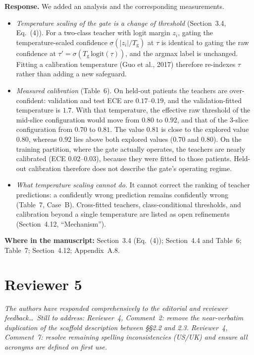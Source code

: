 \documentclass[11pt]{article}
\newenvironment{rcomment}{\par\noindent\begin{minipage}{\linewidth}\itshape\color{black!75}}{\end{minipage}\par}
\newcommand{\where}[1]{\par\noindent\textbf{Where in the manuscript:} #1\par}
\begin{document}
\textbf{Response.} We added an analysis and the corresponding measurements.
\begin{itemize}[leftmargin=1.4em]
  \item \emph{Temperature scaling of the gate is a change of threshold} (Section~3.4, Eq.~(4)). For a two-class teacher with logit margin $z_i$, gating the temperature-scaled confidence $\sigma(|z_i|/T_{\mathrm{g}})$ at $\tau$ is identical to gating the raw confidence at $\tau'=\sigma(T_{\mathrm{g}}\,\mathrm{logit}(\tau))$, and the argmax label is unchanged. Fitting a calibration temperature (Guo et al., 2017) therefore re-indexes $\tau$ rather than adding a new safeguard.
  \item \emph{Measured calibration} (Table~6). On held-out patients the teachers are over-confident: validation and test ECE are $0.17$--$0.19$, and the validation-fitted temperature is $1.7$. With that temperature, the effective raw threshold of the mid-slice configuration would move from $0.80$ to $0.92$, and that of the 3-slice configuration from $0.70$ to $0.81$. The value $0.81$ is close to the explored value $0.80$, whereas $0.92$ lies above both explored values ($0.70$ and $0.80$). On the training partition, where the gate actually operates, the teachers are nearly calibrated (ECE $0.02$--$0.03$), because they were fitted to those patients. Held-out calibration therefore does not describe the gate's operating regime.
  \item \emph{What temperature scaling cannot do.} It cannot correct the ranking of teacher predictions: a confidently wrong prediction remains confidently wrong (Table~7, Case~B). Cross-fitted teachers, class-conditional thresholds, and calibration beyond a single temperature are listed as open refinements (Section~4.12, ``Mechanism'').
\end{itemize}
\where{Section~3.4 (Eq.~(4)); Section~4.4 and Table~6; Table~7; Section~4.12; Appendix~A.8.}

\hrulefill

\section*{Reviewer 5}

\begin{rcomment}
The authors have responded comprehensively to the editorial and reviewer feedback\ldots\ Still to address: Reviewer~4, Comment~2: remove the near-verbatim duplication of the scaffold description between \S\S2.2 and 2.3. Reviewer~4, Comment~7: resolve remaining spelling inconsistencies (US/UK) and ensure all acronyms are defined on first use.
\end{rcomment}
\end{document}
